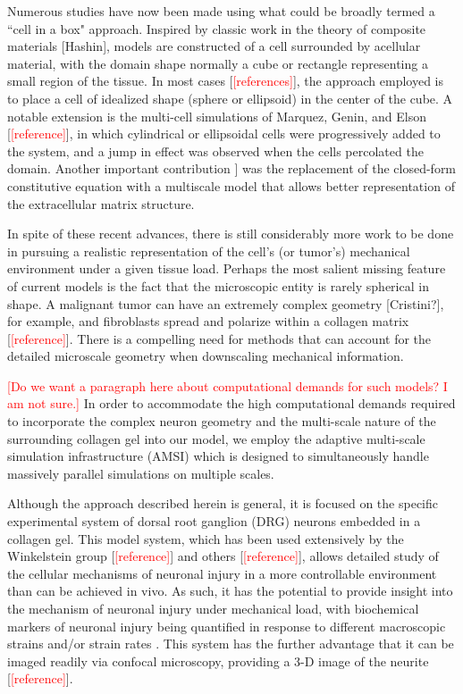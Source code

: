 \documentclass[]{interact}
\newcommand{\red}[1]{\textcolor{red}{[#1]}}
\begin{document}
Numerous studies have now been made using what could be broadly termed a ``cell in a box" approach. Inspired by classic work in the theory of composite materials [Hashin], models are constructed of a cell surrounded by acellular material, with the domain shape normally a cube or rectangle representing a small region of the tissue.  In most cases [\red{references}], the approach employed is to place a cell of idealized shape (sphere or ellipsoid) in the center of the cube. A notable extension is the multi-cell simulations of Marquez, Genin, and Elson [\red{reference}], in which cylindrical or ellipsoidal cells were progressively added to the system, and a jump in effect was observed when the cells percolated the domain.  Another important contribution \citep{Lai:2013fp}] was the replacement of the closed-form constitutive equation with a multiscale model that allows better representation of the extracellular matrix structure.

In spite of these recent advances, there is still considerably more work to be done in pursuing a realistic representation of the cell's (or tumor's) mechanical environment under a given tissue load. Perhaps the most salient missing feature of current models is the fact that the microscopic entity is rarely spherical in shape.  A malignant tumor can have an extremely complex geometry [Cristini?], for example, and fibroblasts spread and polarize within a collagen matrix [\red{reference}]. There is a compelling need for methods that can account for the detailed microscale geometry when downscaling mechanical information.

\red{Do we want a paragraph here about computational demands for such models? I am not sure.} In order to accommodate the high computational demands required to incorporate the complex neuron geometry and the multi-scale nature of the surrounding collagen gel into our model, we employ the adaptive multi-scale simulation infrastructure (AMSI) \citep{Delalondre:2010kt} which is designed to simultaneously handle massively parallel simulations on multiple scales. 

Although the approach described herein is general, it is focused on the specific experimental system of dorsal root ganglion (DRG) neurons embedded in a collagen gel. This model system, which has been used extensively by the Winkelstein group [\red{reference}] and others [\red{reference}], allows detailed study of the cellular mechanisms of neuronal injury in a more controllable environment than can be achieved in vivo. As such, it has the potential to provide insight into the mechanism of neuronal injury under mechanical load, with biochemical markers of neuronal injury being quantified in response to different macroscopic strains and/or strain rates \citep{Zhang:2016ga}. This system has the further advantage that it can be imaged readily via confocal microscopy, providing a 3-D image of the neurite [\red{reference}].
\end{document}
